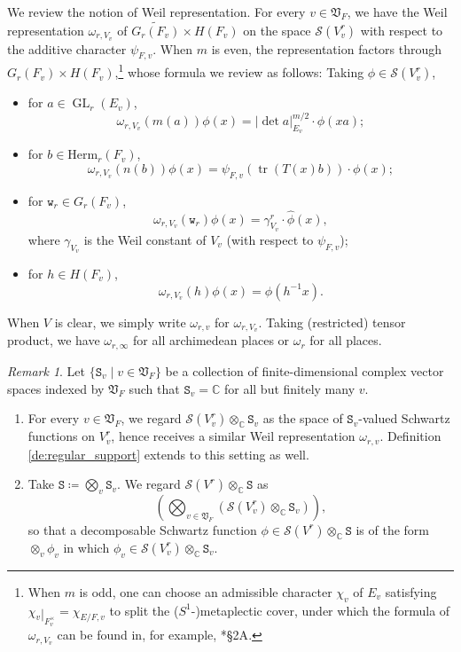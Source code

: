 \documentclass[12pt]{amsart}
\numberwithin{equation}{section}
\theoremstyle{plain}
\theoremstyle{definition}
\theoremstyle{remark}
\newtheorem{remark}[proposition]{Remark}
\renewcommand{\d}[1]{\mathbb{#1}}
\newcommand{\f}[1]{\mathfrak{#1}}
\renewcommand{\r}[1]{\mathrm{#1}}
\newcommand{\s}[1]{\mathscr{#1}}
\renewcommand{\(}{\left(}
\renewcommand{\)}{\right)}
\newcommand{\res}{\mathbin{|}}
\newcommand{\dC}{\d C}
\newcommand{\fV}{\f V}
\newcommand{\sS}{\s S}
\newcommand{\tS}{\mathtt{S}}
\newcommand{\tw}{\mathtt{w}}
\newcommand{\Herm}{\r{Herm}}
\DeclareMathOperator{\GL}{GL}
\DeclareMathOperator{\tr}{tr}
\begin{document}
We review the notion of Weil representation. For every $v\in\fV_F$, we have the Weil representation $\omega_{r,V_v}$ of $\widetilde{G_r(F_v)}\times H(F_v)$ on the space $\sS(V_v^r)$ with respect to the additive character $\psi_{F,v}$. When $m$ is even, the representation factors through $G_r(F_v)\times H(F_v)$,\footnote{When $m$ is odd, one can choose an admissible character $\chi_v$ of $E_v$ satisfying $\chi_v\res_{F_v^\times}=\chi_{E/F,v}$ to split the ($S^1$-)metaplectic cover, under which the formula of $\omega_{r,V_v}$ can be found in, for example, \cite{Liu11}*{\S2A}.} whose formula we review as follows: Taking $\phi\in\sS(V_v^r)$,
\begin{itemize}
  \item for $a\in\GL_r(E_v)$,
    \[
    \omega_{r,V_v}(m(a))\phi(x)=|\det a|_{E_v}^{m/2}\cdot \phi(x a);
    \]

  \item for $b\in\Herm_r(F_v)$,
    \[
    \omega_{r,V_v}(n(b))\phi(x)=\psi_{F,v}(\tr (T(x)b))\cdot\phi(x);
    \]

  \item for $\tw_r\in G_r(F_v)$,
    \[
    \omega_{r,V_v}\(\tw_r\)\phi(x)=\gamma_{V_v}^r\cdot\widehat\phi(x),
    \]
    where $\gamma_{V_v}$ is the Weil constant of $V_v$ (with respect to $\psi_{F,v}$);

  \item for $h\in H(F_v)$,
    \[
    \omega_{r,V_v}(h)\phi(x)=\phi(h^{-1}x).
    \]
\end{itemize}
When $V$ is clear, we simply write $\omega_{r,v}$ for $\omega_{r,V_v}$. Taking (restricted) tensor product, we have $\omega_{r,\infty}$ for all archimedean places or $\omega_r$ for all places.


\begin{remark}\label{re:schwartz_vector}
Let $\{\tS_v\res v\in\fV_F\}$ be a collection of finite-dimensional complex vector spaces indexed by $\fV_F$ such that $\tS_v=\dC$ for all but finitely many $v$.
\begin{enumerate}
  \item For every $v\in\fV_F$, we regard $\sS(V_v^r)\otimes_\dC\tS_v$ as the space of $\tS_v$-valued Schwartz functions on $V_v^r$, hence receives a similar Weil representation $\omega_{r,v}$. Definition \ref{de:regular_support} extends to this setting as well.

  \item Take $\tS\coloneqq\bigotimes_v\tS_v$. We regard $\sS(V^r)\otimes_\dC\tS$ as
      \[
      \(\bigotimes_{v\in\fV_F}\(\sS(V_v^r)\otimes_\dC\tS_v\)\),
      \]
      so that a decomposable Schwartz function $\phi\in\sS(V^r)\otimes_\dC\tS$ is of the form $\otimes_v\phi_v$ in which $\phi_v\in\sS(V_v^r)\otimes_\dC\tS_v$.
\end{enumerate}
\end{remark}
\end{document}
